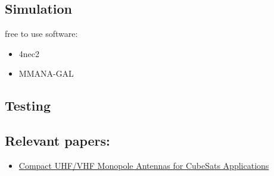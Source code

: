 \subsection{Simulation}
free to use software:
\begin{itemize}
	\item 4nec2
	\item MMANA-GAL
\end{itemize}

\subsection{Testing}

\subsection{Relevant papers:}
\begin{itemize}
	\item \href{}{Compact UHF/VHF Monopole Antennas for CubeSats Applications}
\end{itemize}



